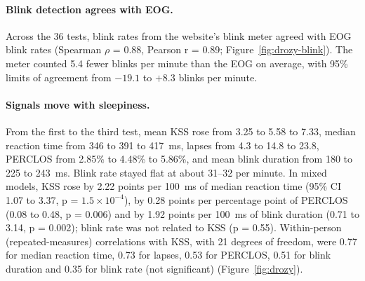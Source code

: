 \paragraph{Blink detection agrees with EOG.} Across the 36 tests, blink rates from the website's blink meter agreed with EOG blink rates (Spearman $\rho$ = 0.88, Pearson r = 0.89; Figure~\ref{fig:drozy-blink}). The meter counted 5.4 fewer blinks per minute than the EOG on average, with 95\% limits of agreement from $-19.1$ to $+8.3$ blinks per minute.

\paragraph{Signals move with sleepiness.} From the first to the third test, mean KSS rose from 3.25 to 5.58 to 7.33, median reaction time from 346 to 391 to 417~ms, lapses from 4.3 to 14.8 to 23.8, PERCLOS from 2.85\% to 4.48\% to 5.86\%, and mean blink duration from 180 to 225 to 243~ms. Blink rate stayed flat at about 31--32 per minute. In mixed models, KSS rose by 2.22 points per 100~ms of median reaction time (95\% CI 1.07 to 3.37, p = $1.5\times10^{-4}$), by 0.28 points per percentage point of PERCLOS (0.08 to 0.48, p = 0.006) and by 1.92 points per 100~ms of blink duration (0.71 to 3.14, p = 0.002); blink rate was not related to KSS (p = 0.55). Within-person (repeated-measures) correlations with KSS, with 21 degrees of freedom, were 0.77 for median reaction time, 0.73 for lapses, 0.53 for PERCLOS, 0.51 for blink duration and 0.35 for blink rate (not significant) (Figure~\ref{fig:drozy}).

